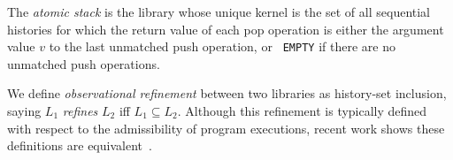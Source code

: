 \begin{example}
  \label{ex:atomic_stack}

  The \emph{atomic stack} is the library whose unique kernel is the set of all
  sequential histories for which the return value of each pop operation is
  either the argument value $v$ to the last unmatched push operation, or {\tt
  EMPTY} if there are no unmatched push operations.

\end{example}

We define \emph{observational refinement} between two libraries as history-set
inclusion, saying $L_1$ \emph{refines} $L_2$ if{f} $L_1\subseteq L_2$. Although
this refinement is typically defined with respect to the admissibility of
program executions, recent work shows these definitions are
equivalent~\cite{conf/popl/BouajjaniEEH15}.


